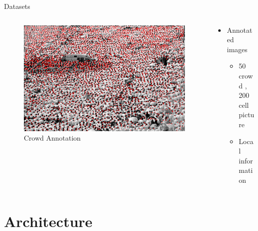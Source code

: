 \documentclass[11pt)]{beamer}
\begin{document}
\begin{frame}{Datasets}
\begin{columns}
	\begin{column}{.5\textwidth}
		\begin{figure}[ht]
			\centering
			\includegraphics[width=\textwidth]{annotation}
			\caption{Crowd Annotation}
		\end{figure}
	\end{column}
	\begin{column}{.5\textwidth}
		\begin{itemize}
			\item Annotated images
			\begin{itemize}
				\item 50 crowd , 200 cell picture
				\item Local information
			\end{itemize}
		\end{itemize}
	\end{column}
\end{columns}
\end{frame}

\section{Architecture}

%
\end{document}
